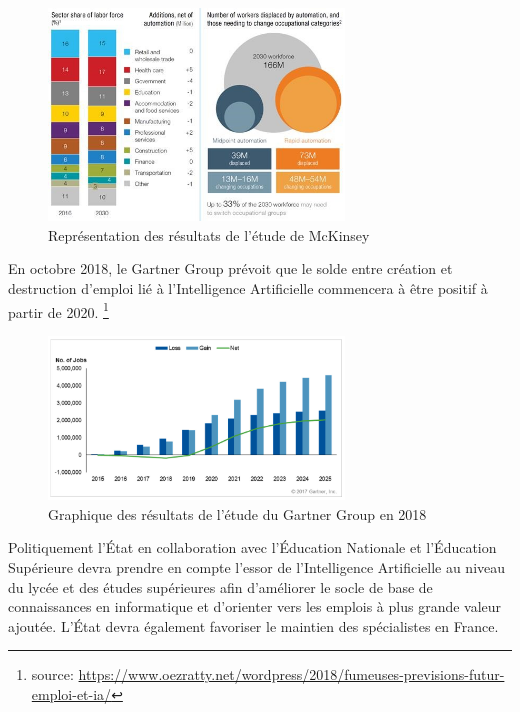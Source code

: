     \begin{figure}[H]
        \centering
        \includegraphics[width=0.7\textwidth]{Images/laborforceevolution}
        \caption{Représentation des résultats de l'étude de McKinsey}
        \label{fig:explicability}
    \end{figure}

    En octobre 2018, le Gartner Group prévoit que le solde entre création et destruction d'emploi lié à l'Intelligence Artificielle
    commencera à être positif à partir de 2020.
    \footnote{source: \url{https://www.oezratty.net/wordpress/2018/fumeuses-previsions-futur-emploi-et-ia/}} \newline

    \begin{figure}[H]
        \centering
        \includegraphics[width=0.7\textwidth]{Images/gartneraiandfuturework}
        \caption{Graphique des résultats de l'étude du Gartner Group en 2018}
        \label{fig:explicability}
    \end{figure}

    Politiquement l'État en collaboration avec l'Éducation Nationale et l'Éducation Supérieure devra prendre en compte l'essor de l'Intelligence
    Artificielle au niveau du lycée et des études supérieures afin d'améliorer le socle de base de connaissances en informatique et
    d'orienter vers les emplois à plus grande valeur ajoutée. L'État devra également favoriser le maintien des spécialistes en France. \newline


